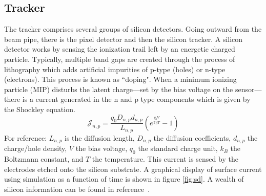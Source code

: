 \subsection{Tracker}

The tracker comprises several groups of silicon detectors. 
Going outward from the beam pipe, there is the pixel detector and then the silicon tracker.
A silicon detector works by sensing the ionization trail left by an energetic charged particle.
Typically, multiple band gaps are created through the process of lithography which adds artificial impurities of p-type (holes) or n-type (electrons). This process is known as ``doping". When a minimum ionizing particle (MIP) disturbs the latent charge---set by the bias voltage on the sensor---there is a current generated in the n and p type components which is given by the Shockley equation.
\begin{equation}
\label{eq:shockley}
\mathcal{J}_{n,p} = \frac{q_0 D_{n,p} d_{n,p}}{L_{n,p}}\left(e^{\frac{q_0 V}{k_B T}} - 1 \right)
\end{equation}
For reference: $L_{n,p}$ is the diffusion length, $D_{n,p}$ the diffusion coefficients, $d_{n,p}$ the charge/hole density, $V$ the bias voltage, $q_0$ the standard charge unit, $k_B$ the Boltzmann constant, and $T$ the temperature. 
This current is sensed by the electrodes etched onto the silicon substrate. 
A graphical display of surface current using simulation as a function of time is shown in figure \ref{fig:sd}. A wealth of silicon information can be found in reference~\cite{Eichhorn:2112017}.

